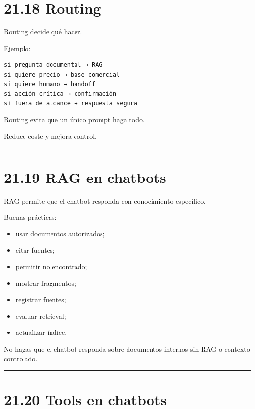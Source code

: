 \section{21.18 Routing}\label{routing}

Routing decide qué hacer.

Ejemplo:

\begin{lstlisting}
si pregunta documental → RAG
si quiere precio → base comercial
si quiere humano → handoff
si acción crítica → confirmación
si fuera de alcance → respuesta segura
\end{lstlisting}

Routing evita que un único prompt haga todo.

Reduce coste y mejora control.

\begin{center}\rule{0.5\linewidth}{0.5pt}\end{center}

\section{21.19 RAG en chatbots}\label{rag-en-chatbots}

RAG permite que el chatbot responda con conocimiento específico.

Buenas prácticas:

\begin{itemize}
\tightlist
\item
  usar documentos autorizados;
\item
  citar fuentes;
\item
  permitir no encontrado;
\item
  mostrar fragmentos;
\item
  registrar fuentes;
\item
  evaluar retrieval;
\item
  actualizar índice.
\end{itemize}

No hagas que el chatbot responda sobre documentos internos sin RAG o
contexto controlado.

\begin{center}\rule{0.5\linewidth}{0.5pt}\end{center}

\section{21.20 Tools en chatbots}\label{tools-en-chatbots}

